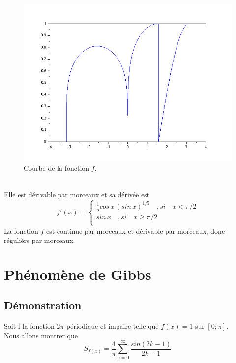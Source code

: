 \documentclass[a4paper,12pt]{report}
\begin{document}
\begin{enumerate}
	\begin{figure}[h!]
		\centering
		\includegraphics[scale=0.6]{ex2_fig5.png}
		\caption{\label{figure5}Courbe de la fonction $f$.}
		\end{figure}
		\\
	Elle est d\'erivable par morceaux et sa d\'eriv\'ee est \[f'(x)=
  \left\{
      \begin{aligned}
        \frac{1}{5}cos\,x\,(sin\,x)^{1/5}\quad , si\quad x < \pi/2\\
        sin\,x\quad ,si\quad x \ge \pi/2\\
      \end{aligned}
    \right.\]
	La fonction $f$ est continue par morceaux et dérivable par morceaux, donc régulière par morceaux.
	\end{enumerate}
\chapter{Phénomène de Gibbs}
\section{Démonstration}
Soit f la fonction 2$\pi$-périodique et impaire telle que $f(x) = 1$ sur $[0; \pi]$.\\

Nous allons montrer que \[S_{f(x)}=\frac{4}{\pi}\sum\limits_{n=0}^{\infty}\frac{sin(2k-1)}{2k-1}\]
\end{document}
